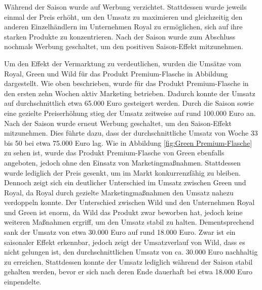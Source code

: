 \documentclass[a4paper,12pt]{article}
\begin{document}
Während der Saison wurde auf Werbung verzichtet.
Stattdessen wurde jeweils einmal der Preis erhöht,
um den Umsatz zu maximieren und gleichzeitig den anderen Einzelhändlern im Unternehmen Royal zu ermöglichen,
sich auf ihre starken Produkte zu konzentrieren.
Nach der Saison wurde zum Abschluss nochmals Werbung geschaltet, um den positiven Saison-Effekt mitzunehmen.

Um den Effekt der Vermarktung zu verdeutlichen, wurden die Umsätze vom Royal, 
Green und Wild für das Produkt Premium-Flasche in Abbildung dargestellt.
Wie oben beschrieben, wurde für das Produkt Premium-Flasche in den ersten zehn Wochen aktiv Marketing betrieben. 
Dadurch konnte der Umsatz auf durchschnittlich etwa 65.000 Euro gesteigert werden.
Durch die Saison sowie eine gezielte Preiserhöhung stieg der Umsatz zeitweise auf rund 100.000 Euro an.
Nach der Saison wurde erneut Werbung geschaltet, um den Saison-Effekt mitzunehmen.
Dies führte dazu, dass der durchschnittliche Umsatz von Woche 33 bis 50 bei etwa 75.000 Euro lag.
Wie in Abbildung \ref{fig:Green Premium-Flasche} zu sehen ist, wurde das Produkt Premium-Flasche von Green ebenfalls angeboten, 
jedoch ohne den Einsatz von Marketingmaßnahmen.
Stattdessen wurde lediglich der Preis gesenkt, um im Markt konkurrenzfähig zu bleiben.
Dennoch zeigt sich ein deutlicher Unterschied im Umsatz zwischen Green und Royal,
da Royal durch gezielte Marketingmaßnahmen den Umsatz nahezu verdoppeln konnte.
Der Unterschied zwischen Wild und den Unternehmen Royal und Green ist enorm, da Wild das Produkt zwar beworben hat,
jedoch keine weiteren Maßnahmen ergriff, um den Umsatz stabil zu halten.
Dementsprechend sank der Umsatz von etwa 30.000 Euro auf rund 18.000 Euro.
Zwar ist ein saisonaler Effekt erkennbar, jedoch zeigt der Umsatzverlauf von Wild, dass es nicht gelungen ist,
den durchschnittlichen Umsatz von ca. 30.000 Euro nachhaltig zu erreichen.
Stattdessen konnte der Umsatz lediglich während der Saison stabil gehalten werden,
bevor er sich nach deren Ende dauerhaft bei etwa 18.000 Euro einpendelte.
\end{document}
